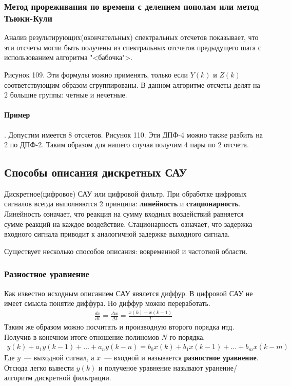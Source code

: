 \subsubsection{Метод прореживания по времени с делением пополам или метод Тьюки-Кули}
Анализ результирующих(окончательных) спектральных отсчетов показывает, что эти отсчеты могли быть получены из спектральных отсчетов предыдущего шага с использованием алгоритма "<бабочка">.

Рисунок 109. Эти формулы можно применять, только если $Y(k)$ и $Z(k)$ соответствующим образом сгруппированы. В данном алгоритме отсчеты делят на 2 большие группы: четные и нечетные.

\paragraph{Пример}. Допустим имеется 8 отсчетов. Рисунок 110. Эти ДПФ-4 можно также разбить на 2 по ДПФ-2. Таким образом для нашего случая получим 4 пары по 2 отсчета.

\subsection{Способы описания дискретных САУ}
Дискретное(цифровое) САУ или цифровой фильтр. При обработке цифровых сигналов всегда выполняются 2 принципа: \textbf{линейность} и \textbf{стационарность}. Линейность означает, что реакция на сумму входных воздействий равняется сумме реакций на каждое воздействие. Стационарность означает, что задержка входного сигнала приводит к аналогичной задержке выходного сигнала.

Существует несколько способов описания: вовременной и частотной области.
\subsubsection{Разностное уравнение}
Как известно исходным описанием САУ явялется диффур. В цифровой САУ не имеет смысла понятие диффура. Но диффур можно переработать. 
\begin{align*}
	\frac{dx}{dt}=\frac{\Delta{}x}{\Delta{}t}=\frac{x(k)-x(k-1)}{T}
\end{align*}
Таким же образом можно посчитать и производную второго порядка итд. Получив в конечном итоге отношение полиномов $N$-го порядка.
\begin{align*}
	y(k)+a_1y(k-1)+\ldots+a_ny(k-n)=b_0x(k)+b_1x(k-1)+\ldots+b_mx(k-m)
\end{align*}
Где $y$~--- выходной сигнал, а $x$~--- входной и называется \textbf{разностное уравнение}. Отсюда легко вывести $y(k)$ и полученое уравнение называют уранение/алгоритм дискретной фильтрации.

